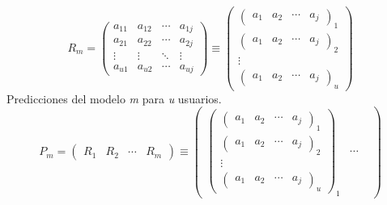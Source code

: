\begin{center}
    \[  \textit{R$_{m}$} = 
        \begin{pmatrix}
            a_{11}  &  a_{12}  &  \cdots   & a_{1j} \\ 
            a_{21}  &  a_{22}  &  \cdots   & a_{2j}\\ 
            \vdots  &  \vdots  &  \ddots & \vdots  \\ 
            a_{u1}  &  a_{u2}  &  \cdots   & a_{uj}
        \end{pmatrix}
        \equiv
        \begin{pmatrix}
            \begin{pmatrix} a_{1}  &  a_{2}  &  \cdots   & a_{j} \end{pmatrix}_{1} \\ 
            \begin{pmatrix} a_{1}  &  a_{2}  &  \cdots   & a_{j} \end{pmatrix}_{2} \\ 
            \vdots \\ 
            \begin{pmatrix} a_{1}  &  a_{2}  &  \cdots   & a_{j} \end{pmatrix}_{u}
        \end{pmatrix}
    \]
    Predicciones del modelo \textit{m} para \textit{u} usuarios.
    \\
    \[  \textit{P$_{m}$}=
        \begin{pmatrix}
            \textit{R$_{1}$} & \textit{R$_{2}$} & \cdots & \textit{R$_{m}$}
        \end{pmatrix}
        \equiv
        \begin{pmatrix}
            \begin{pmatrix}
                \begin{pmatrix} a_{1}  &  a_{2}  &  \cdots   & a_{j} \end{pmatrix}_{1} \\ 
                \begin{pmatrix} a_{1}  &  a_{2}  &  \cdots   & a_{j} \end{pmatrix}_{2} \\ 
                \vdots \\ 
                \begin{pmatrix} a_{1}  &  a_{2}  &  \cdots   & a_{j} \end{pmatrix}_{u}
            \end{pmatrix}_{\textit{1}}
            & 
            \cdots 
            &

\end{pmatrix}\]
\end{center}
